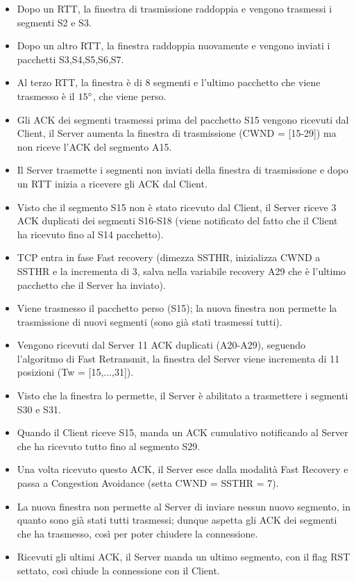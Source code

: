 \documentclass[10pt,a4paper]{article}
\begin{document}
\begin{enumerate}
\begin{itemize}
				\item Dopo un RTT, la finestra di trasmissione raddoppia e vengono trasmessi i segmenti S2 e S3.
				\item Dopo un altro RTT, la finestra raddoppia nuovamente e vengono inviati i pacchetti S3,S4,S5,S6,S7.
				\item Al terzo RTT, la finestra è di 8 segmenti e l'ultimo pacchetto che viene trasmesso è il $15 \degree$, che viene perso.
				\item Gli ACK dei segmenti trasmessi prima del pacchetto S15 vengono ricevuti dal Client, il Server aumenta la finestra di trasmissione (CWND = [15-29]) ma non riceve l'ACK del segmento A15.
				\item Il Server trasmette i segmenti non inviati della finestra di trasmissione e dopo un RTT inizia a ricevere gli ACK dal Client.
				\item Visto che il segmento S15 non è stato ricevuto dal Client, il Server riceve 3 ACK duplicati dei segmenti S16-S18 (viene notificato del fatto che il Client ha ricevuto fino al S14 pacchetto).
				\item TCP entra in fase Fast recovery (dimezza SSTHR, inizializza CWND a SSTHR e la incrementa di 3, salva nella variabile recovery A29 che è l'ultimo pacchetto che il Server ha inviato).
				\item Viene trasmesso il pacchetto perso (S15); la nuova finestra non permette la trasmissione di nuovi segmenti (sono già stati trasmessi tutti).
				\item Vengono ricevuti dal Server 11 ACK duplicati (A20-A29), seguendo l'algoritmo di Fast Retransmit, la finestra del Server viene incrementa di 11 posizioni (Tw = [15,...,31]).
				\item Visto che la finestra lo permette, il Server è abilitato a trasmettere i segmenti S30 e S31.
				\item Quando il Client riceve S15, manda un ACK cumulativo notificando al Server che ha ricevuto tutto fino al segmento S29.
				\item Una volta ricevuto questo ACK, il Server esce dalla modalità Fast Recovery e passa a Congestion Avoidance (setta CWND = SSTHR = 7).
				\item La nuova finestra non permette al Server di inviare nessun nuovo segmento, in quanto sono già stati tutti trasmessi; dunque aspetta gli ACK dei segmenti che ha trasmesso, così per poter chiudere la connessione.
				\item Ricevuti gli ultimi ACK, il Server manda un ultimo segmento, con il flag RST settato, così chiude la connessione con il Client.

\end{itemize}
\end{enumerate}
\end{document}
